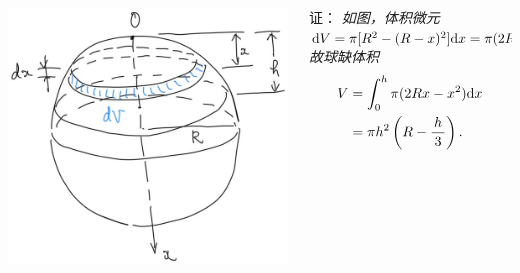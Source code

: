 \begin{frame}
	\linespread{1.5}
	\pause
	
	
	\begin{columns}
		\begin{column}{.5\textwidth}
			\begin{center}
				\includegraphics[width=.9\textwidth]{./images/ch6/topSp.jpg}
			\end{center}		
		\end{column}
		\begin{column}{.5\textwidth}
			\small 证：\it
			如图，体积微元
			$\mathrm{d} V=\pi[R^2-(R-x)^2]\mathrm{d} x=\pi(2Rx-x^2)\mathrm{d} x,$
			故球缺体积
			\begin{align*}
				V&=\displaystyle\int_0^h\pi(2Rx-x^2)\mathrm{d} x\\
				&=\pi h^2\left(R-\displaystyle\frac{\,{h}\,}{\,{3}\,}\right).
			\end{align*}
		\end{column}
	\end{columns}
\end{frame}

